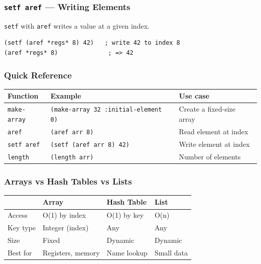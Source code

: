 \subsubsection{\texttt{setf aref} --- Writing Elements}

\texttt{setf} with \texttt{aref} writes a value at a given index.

\begin{lstlisting}
(setf (aref *regs* 8) 42)   ; write 42 to index 8
(aref *regs* 8)              ; => 42
\end{lstlisting}

\subsubsection{Quick Reference}

\begin{center}
\begin{tabular}{llp{5cm}}
  \toprule
  \textbf{Function} & \textbf{Example} & \textbf{Use case} \\
  \midrule
  \texttt{make-array}  & \texttt{(make-array 32 :initial-element 0)} & Create a fixed-size array \\
  \texttt{aref}        & \texttt{(aref arr 8)}    & Read element at index \\
  \texttt{setf aref}   & \texttt{(setf (aref arr 8) 42)} & Write element at index \\
  \texttt{length}      & \texttt{(length arr)}    & Number of elements \\
  \bottomrule
\end{tabular}
\end{center}

\subsubsection{Arrays vs Hash Tables vs Lists}

\begin{center}
\begin{tabular}{llll}
  \toprule
  & \textbf{Array} & \textbf{Hash Table} & \textbf{List} \\
  \midrule
  Access   & O(1) by index   & O(1) by key    & O(n) \\
  Key type & Integer (index) & Any            & Any \\
  Size     & Fixed           & Dynamic        & Dynamic \\
  Best for & Registers, memory & Name lookup  & Small data \\
  \bottomrule
\end{tabular}
\end{center}


